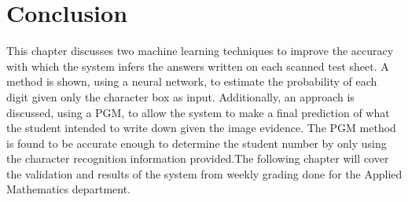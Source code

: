 \section{Conclusion}
This chapter discusses two machine learning techniques to improve the accuracy with which the system infers the answers written on each scanned test sheet. A method is shown, using a neural network, to estimate the probability of each digit given only the character box as input. Additionally, an approach is discussed, using a PGM, to allow the system to make a final prediction of what the student intended to write down given the image evidence. The PGM method is found to be accurate enough to determine the student number by only using the character recognition information provided.The following chapter will cover the validation and results of the system from weekly grading done for the Applied Mathematics department.